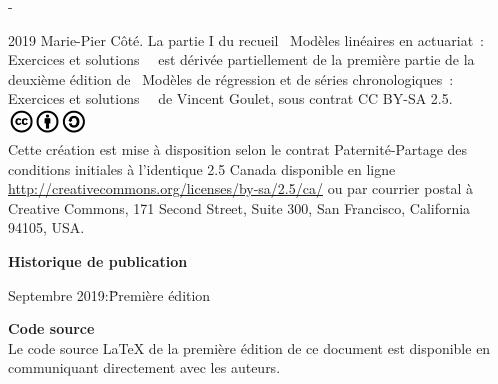 \begingroup
\calccentering{\unitlength}
\begin{adjustwidth*}{\unitlength}{-\unitlength}
  \small
  \setlength{\parindent}{0pt}
  \setlength{\parskip}{\baselineskip}

  {\textcopyright} 2019 Marie-Pier Côté. La partie I du recueil \og~Modèles linéaires en actuariat~: Exercices et solutions~\fg~ est dérivée partiellement de la première partie de la deuxième édition de \og~Modèles de régression et de séries chronologiques~: Exercices et solutions~\fg~ de Vincent Goulet, sous contrat CC BY-SA 2.5. \\
  

  \includegraphics[height=7mm,keepaspectratio=true]{cc-by-sa.jpg} \\  
  Cette création est mise à disposition selon le contrat
  Paternité-Partage des conditions initiales à l'identique 2.5 Canada
  disponible en ligne
  \url{http://creativecommons.org/licenses/by-sa/2.5/ca/} ou par
  courrier postal à Creative Commons, 171 Second Street, Suite 300,
  San Francisco, California 94105, USA.


  \textbf{Historique de publication}
  \vspace{-\baselineskip}
  \begin{tabbing}
    Septembre 2019:\quad\= Première édition 
  \end{tabbing}

  \textbf{Code source} \\
  Le code source {\LaTeX} de la première édition de ce document est disponible en communiquant directement avec les auteurs.

  \vspace{1cm}

\end{adjustwidth*}
\endgroup

\renewcommand{\sfdefault}{phv}

\clearpage

